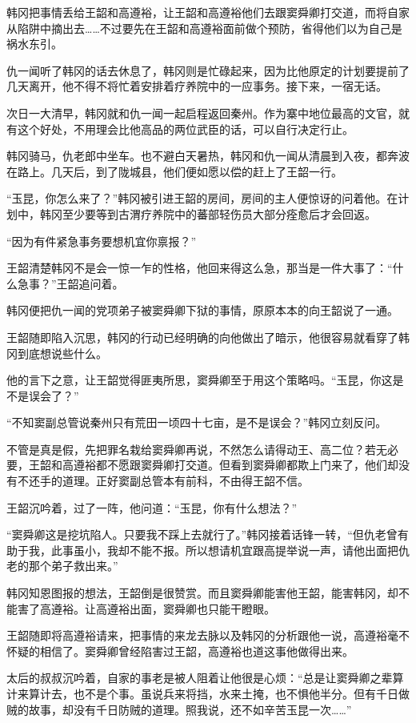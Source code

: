 韩冈把事情丢给王韶和高遵裕，让王韶和高遵裕他们去跟窦舜卿打交道，而将自家从陷阱中摘出去……不过要先在王韶和高遵裕面前做个预防，省得他们以为自己是祸水东引。

仇一闻听了韩冈的话去休息了，韩冈则是忙碌起来，因为比他原定的计划要提前了几天离开，他不得不将忙着安排着疗养院中的一应事务。接下来，一宿无话。

次日一大清早，韩冈就和仇一闻一起启程返回秦州。作为寨中地位最高的文官，就有这个好处，不用理会比他高品的两位武臣的话，可以自行决定行止。

韩冈骑马，仇老郎中坐车。也不避白天暑热，韩冈和仇一闻从清晨到入夜，都奔波在路上。几天后，到了陇城县，他们便如愿以偿的赶上了王韶一行。

“玉昆，你怎么来了？”韩冈被引进王韶的房间，房间的主人便惊讶的问着他。在计划中，韩冈至少要等到古渭疗养院中的蕃部轻伤员大部分痊愈后才会回返。

“因为有件紧急事务要想机宜你禀报？”

王韶清楚韩冈不是会一惊一乍的性格，他回来得这么急，那当是一件大事了：“什么急事？”王韶追问着。

韩冈便把仇一闻的党项弟子被窦舜卿下狱的事情，原原本本的向王韶说了一通。

王韶随即陷入沉思，韩冈的行动已经明确的向他做出了暗示，他很容易就看穿了韩冈到底想说些什么。

他的言下之意，让王韶觉得匪夷所思，窦舜卿至于用这个策略吗。“玉昆，你这是不是误会了？”

“不知窦副总管说秦州只有荒田一顷四十七亩，是不是误会？”韩冈立刻反问。

不管是真是假，先把罪名栽给窦舜卿再说，不然怎么请得动王、高二位？若无必要，王韶和高遵裕都不愿跟窦舜卿打交道。但看到窦舜卿都欺上门来了，他们却没有不还手的道理。正好窦副总管本有前科，不由得王韶不信。

王韶沉吟着，过了一阵，他问道：“玉昆，你有什么想法？”

“窦舜卿这是挖坑陷人。只要我不踩上去就行了。”韩冈接着话锋一转，“但仇老曾有助于我，此事虽小，我却不能不报。所以想请机宜跟高提举说一声，请他出面把仇老的那个弟子救出来。”

韩冈知恩图报的想法，王韶倒是很赞赏。而且窦舜卿能害他王韶，能害韩冈，却不能害了高遵裕。让高遵裕出面，窦舜卿也只能干瞪眼。

王韶随即将高遵裕请来，把事情的来龙去脉以及韩冈的分析跟他一说，高遵裕毫不怀疑的相信了。窦舜卿曾经陷害过王韶，高遵裕也道这事他做得出来。

太后的叔叔沉吟着，自家的事老是被人阻着让他很是心烦：“总是让窦舜卿之辈算计来算计去，也不是个事。虽说兵来将挡，水来土掩，也不惧他半分。但有千日做贼的故事，却没有千日防贼的道理。照我说，还不如辛苦玉昆一次……”

